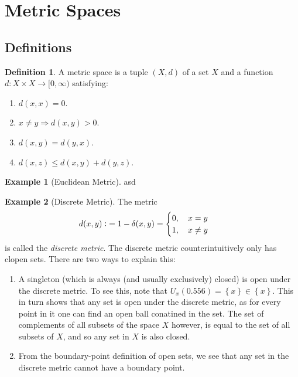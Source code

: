 \documentclass{article}
\theoremstyle{definition}
\newtheorem{defn}{Definition}[subsubsection]
\newtheorem{example}{Example}[subsubsection]
\begin{document}
\section{Metric Spaces}
\subsection{Definitions}
\begin{defn}
	A metric space is a tuple $(X,d)$ of a set $X$ and a function $d:X\times X\rightarrow[0,\infty)$ satisfying:
	\begin{enumerate}
		\item $d(x,x)=0$.
		\item $x\not=y\Rightarrow d(x,y)>0$.
		\item $d(x,y)=d(y,x)$.
		\item $d(x,z)\leq d(x,y)+d(y,z)$.
	\end{enumerate}
\end{defn}
\begin{example}[Euclidean Metric]
	asd
\end{example}
\begin{example}[Discrete Metric]
	The metric
	\begin{align*}
		d(x,y)\vcentcolon&=1-\delta(x,y)=\begin{cases}
			0,\quad x=y\\
			1,\quad x\not=y
		\end{cases}
	\end{align*}
	is called the \emph{discrete metric}. The discrete metric counterintuitively only has clopen sets. There are two ways to explain this:
	\begin{enumerate}
		\item A singleton (which is always (and usually exclusively) closed) is open under the discrete metric. To see this, note that $U_x(0.556)=\left\{x\right\}\in\left\{x\right\}$. This in turn shows that any set is open under the discrete metric, as for every point in it one can find an open ball conatined in the set. The set of complements of all subsets of the space $X$ however, is equal to the set of all subsets of $X$, and so any set in $X$ is also closed.
		\item From the boundary-point definition of open sets, we see that any set in the discrete metric cannot have a boundary point.	
	\end{enumerate}
\end{example}
\end{document}
